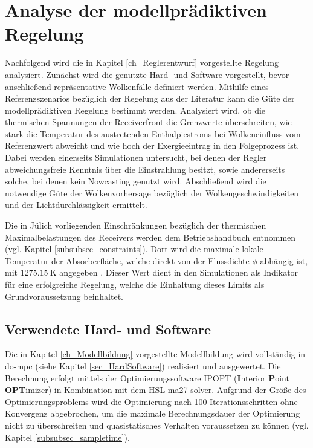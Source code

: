 \chapter{Analyse der modellprädiktiven Regelung} \label{ch_AnalyseRegelung}
Nachfolgend wird die in Kapitel \ref{ch_Reglerentwurf} vorgestellte Regelung analysiert.
Zunächst wird die genutzte Hard- und Software vorgestellt, bevor anschließend repräsentative Wolkenfälle definiert werden.
Mithilfe eines Referenzszenarios bezüglich der Regelung aus der Literatur kann die Güte der modellprädiktiven Regelung bestimmt werden.
Analysiert wird, ob die thermischen Spannungen der Receiverfront die Grenzwerte überschreiten, wie stark die Temperatur des austretenden Enthalpiestroms bei Wolkeneinfluss vom Referenzwert abweicht und wie hoch der Exergieeintrag in den Folgeprozess ist.
Dabei werden einerseits Simulationen untersucht, bei denen der Regler abweichungsfreie Kenntnis über die Einstrahlung besitzt, sowie andererseits solche, bei denen kein Nowcasting genutzt wird.
Abschließend wird die notwendige Güte der Wolkenvorhersage bezüglich der Wolkengeschwindigkeiten und der Lichtdurchlässigkeit ermittelt.

Die in Jülich vorliegenden Einschränkungen bezüglich der thermischen Maximalbelastungen des Receivers werden dem Betriebshandbuch entnommen (vgl. Kapitel \ref{subsubsec_constraints}).
Dort wird die maximale lokale Temperatur der Absorberfläche, welche direkt von der Flussdichte $\phi$ abhängig ist, mit $\SI{1275.15}{\kelvin}$ angegeben \cite[S.29]{HandbuchJülich}. Dieser Wert dient in den Simulationen als Indikator für eine erfolgreiche Regelung, welche die Einhaltung dieses Limits als Grundvoraussetzung beinhaltet.

\section{Verwendete Hard- und Software} \label{sec_Hardsoftanalyse}
Die in Kapitel \ref{ch_Modellbildung} vorgestellte Modellbildung wird vollständig in do-mpc (siehe Kapitel \ref{sec_HardSoftware}) realisiert und ausgewertet.
Die Berechnung erfolgt mittels der Optimierungssoftware IPOPT (\textbf{I}nterior \textbf{P}oint \textbf{OPT}imizer) in Kombination mit dem HSL ma27 solver.
Aufgrund der Größe des Optimierungsproblems wird die Optimierung nach 100 Iterationsschritten ohne Konvergenz abgebrochen, um die maximale Berechnungsdauer der Optimierung nicht zu überschreiten und quasistatisches Verhalten voraussetzen zu können (vgl. Kapitel \ref{subsubsec_sampletime}).

